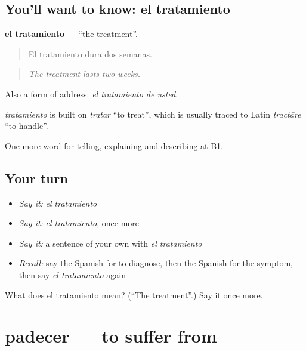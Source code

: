 \subsection*{You'll want to know: el tratamiento}
\textbf{el tratamiento} — \textquotedblleft{}the treatment\textquotedblright{}.

\begin{quote}
El tratamiento dura dos semanas.
\end{quote}

\begin{quote}
\emph{The treatment lasts two weeks.}
\end{quote}

Also a form of address: \emph{el tratamiento de usted}.

\begin{cousinweb}
\emph{tratamiento} is built on \emph{tratar} \textquotedblleft{}to treat\textquotedblright{}, which is usually traced to Latin \emph{tractāre} \textquotedblleft{}to handle\textquotedblright{}.
\end{cousinweb}

\begin{grammarlens}[title={What you've built}]
One more word for telling, explaining and describing at B1.
\end{grammarlens}

\subsection*{Your turn}
\begin{itemize}
\raggedright
  \item \emph{Say it:} \emph{el tratamiento}
  \item \emph{Say it:} \emph{el tratamiento}, once more
  \item \emph{Say it:} a sentence of your own with \emph{el tratamiento}
  \item \emph{Recall:} say the Spanish for to diagnose, then the Spanish for the symptom, then say \emph{el tratamiento} again
\end{itemize}

\begin{tcolorbox}[breakable,colback=teal!4,colframe=teal!35!black,title={Before you move on}]
What does el tratamiento mean? (\textquotedblleft{}The treatment\textquotedblright{}.) Say it once more.
\end{tcolorbox}
\section[padecer]{padecer — to suffer from}

